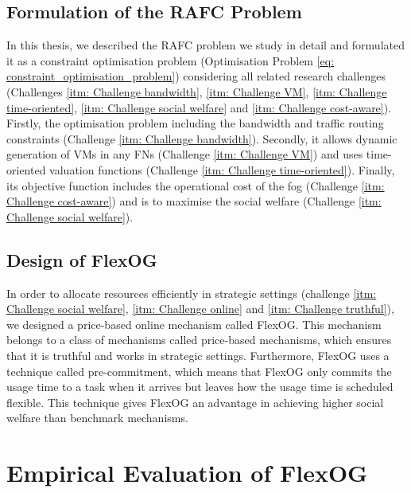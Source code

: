 \documentclass[11pt]{phdthesis}
\begin{document}
\subsection{Formulation of the RAFC Problem} \label{formulation of the RAFC problem}

In this thesis, we described the RAFC problem we study in detail and formulated it as a constraint optimisation problem (Optimisation Problem \ref{eq: constraint_optimisation_problem}) considering all related research challenges (Challenges \ref{itm: Challenge bandwidth}, \ref{itm: Challenge VM}, \ref{itm: Challenge time-oriented}, \ref{itm: Challenge social welfare} and \ref{itm: Challenge cost-aware}). Firstly, the optimisation problem including the bandwidth and traffic routing constraints (Challenge \ref{itm: Challenge bandwidth}). Secondly, it allows dynamic generation of VMs in any FNs (Challenge \ref{itm: Challenge VM}) and uses time-oriented valuation functions (Challenge \ref{itm: Challenge time-oriented}). Finally, its objective function includes the operational cost of the fog (Challenge \ref{itm: Challenge cost-aware}) and is to maximise the social welfare (Challenge \ref{itm: Challenge social welfare}). 

\subsection{Design of FlexOG} \label{design of FlexOG}

In order to allocate resources efficiently in strategic settings (challenge \ref{itm: Challenge social welfare}, \ref{itm: Challenge online} and \ref{itm: Challenge truthful}), we designed a price-based online mechanism called FlexOG. This mechanism belongs to a class of mechanisms called price-based mechanisms, which ensures that it is truthful and works in strategic settings. Furthermore, FlexOG uses a technique called pre-commitment, which means that FlexOG only commits the usage time to a task when it arrives but leaves how the usage time is scheduled flexible. This technique gives FlexOG an advantage in achieving higher social welfare than benchmark mechanisms. 

\section{Empirical Evaluation of FlexOG} \label{empirical evaluation of FlexOG}
\end{document}
